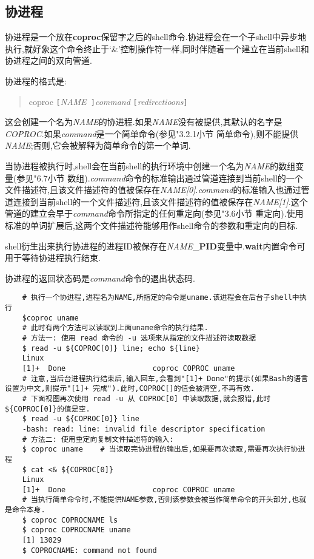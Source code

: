 \documentclass[draft,openany]{book}
\begin{document}
\begin{CJK}{UTF8}{gbsn}
    \subsection{协进程}
    协进程是一个放在\textbf{coproc}保留字之后的shell命令.协进程会在一个子shell中异步地执行,就好象这个命令终止于`\&'控制操作符一样,同时伴随着一个建立在当前shell和协进程之间的双向管道.\par
    协进程的格式是:
    \begin{quote}
        coproc \verb+[+\emph{NAME}\verb+ ]+\emph{command} \verb+[+\emph{redirectioons}\verb+]+
    \end{quote}
    这会创建一个名为\emph{NAME}的协进程.如果\emph{NAME}没有被提供,其默认的名字是\emph{COPROC}.如果\emph{command}是一个简单命令(参见"3.2.1小节 简单命令),则不能提供\emph{NAME};否则,它会被解释为简单命令的第一个单词.\par
    当协进程被执行时,shell会在当前shell的执行环境中创建一个名为\emph{NAME}的数组变量(参见"6.7小节 数组).\emph{command}命令的标准输出通过管道连接到当前shell的一个文件描述符,且该文件描述符的值被保存在\emph{NAME[0]}.\emph{command}的标准输入也通过管道连接到当前shell的一个文件描述符,且该文件描述符的值被保存在\emph{NAME[1]}.这个管道的建立会早于\emph{command}命令所指定的任何重定向(参见"3.6小节 重定向).使用标准的单词扩展后,这两个文件描述符能够用作shell命令的参数和重定向的目标.\par
    shell衍生出来执行协进程的进程ID被保存在\emph{NAME}\_\textbf{PID}变量中.\textbf{wait}内置命令可用于等待协进程执行结束.\par
    协进程的返回状态码是\emph{command}命令的退出状态码.
    \begin{verbatim}
    # 执行一个协进程,进程名为NAME,所指定的命令是uname.该进程会在后台子shell中执行
    $coproc uname
    # 此时有两个方法可以读取到上面uname命令的执行结果.
    # 方法一: 使用 read 命令的 -u 选项来从指定的文件描述符读取数据
    $ read -u ${COPROC[0]} line; echo ${line}
    Linux
    [1]+  Done                    coproc COPROC uname
    # 注意,当后台进程执行结束后,输入回车,会看到"[1]+ Done"的提示(如果Bash的语言设置为中文,则提示"[1]+ 完成").此时,COPROC[]的值会被清空,不再有效.
    # 下面视图再次使用 read -u 从 COPROC[0] 中读取数据,就会报错,此时${COPROC[0]}的值是空.
    $ read -u ${COPROC[0]} line
    -bash: read: line: invalid file descriptor specification
    # 方法二: 使用重定向复制文件描述符的输入:
    $ coproc uname    # 当读取完协进程的输出后,如果要再次读取,需要再次执行协进程
    $ cat <& ${COPROC[0]}
    Linux
    [1]+  Done                    coproc COPROC uname
    # 当执行简单命令时,不能提供NAME参数,否则该参数会被当作简单命令的开头部分,也就是命令本身.
    $ coproc COPROCNAME ls
    $ coproc COPROCNAME uname
    [1] 13029
    $ COPROCNAME: command not found


\end{verbatim}
\end{CJK}
\end{document}
